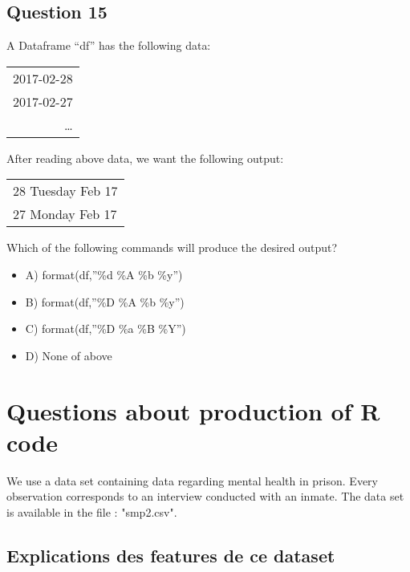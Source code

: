 \documentclass[11pt]{article}
\begin{document}
\subsection*{Question 15}
\label{sec:org0ae011d}
A Dataframe “df” has the following data:

\begin{center}
\begin{tabular}{r}
2017-02-28\\
2017-02-27\\
\ldots{}\\
\end{tabular}
\end{center}

After reading above data, we want the following output:

\begin{center}
\begin{tabular}{l}
28 Tuesday Feb 17\\
27 Monday Feb 17\\
\end{tabular}
\end{center}

Which of the following commands will produce the desired output?

\begin{itemize}
\item A) format(df,”\%d \%A \%b \%y”)

\item B) format(df,”\%D \%A \%b \%y”)

\item C) format(df,”\%D \%a \%B \%Y”)

\item D) None of above
\end{itemize}

\section*{Questions about production of R code}
\label{sec:org4209553}
We use a data set containing data regarding mental health in prison. Every
observation corresponds to an interview conducted with an inmate. The data set
is available in the file : "smp2.csv".

\subsection*{Explications des features de ce dataset}
\label{sec:org7adcca7}
\end{document}
